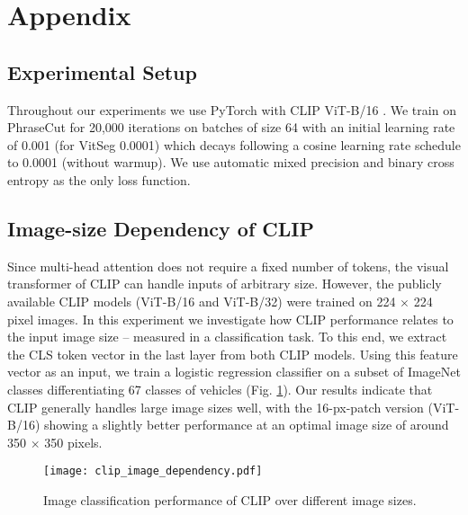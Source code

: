 \documentclass[10pt,twocolumn,letterpaper]{article}
\begin{document}
{
\small


}

\clearpage

\section*{Appendix}

\subsection*{Experimental Setup}

\label{sec:train_setup}

Throughout our experiments we use PyTorch \cite{pytorch} with CLIP ViT-B/16 \cite{radford20}. We train on PhraseCut \cite{wu20phrasecut} for 20,000 iterations on batches of size 64 with an initial learning rate of 0.001 (for VitSeg 0.0001) which decays following a cosine learning rate schedule to 0.0001 (without warmup). We use automatic mixed precision and binary cross entropy as the only loss function.


\subsection*{Image-size Dependency of CLIP}
Since multi-head attention does not require a fixed number of tokens, the visual transformer of CLIP can handle inputs of arbitrary size. However, the publicly available CLIP models (ViT-B/16 and ViT-B/32) were trained on 224 $\times$ 224 pixel images. In this experiment we investigate how CLIP performance relates to the input image size -- measured in a classification task.
To this end, we extract the CLS token vector in the last layer from both CLIP models. Using this feature vector as an input, we train a logistic regression classifier on a subset of ImageNet \cite{imagenet} classes differentiating 67 classes of vehicles (Fig. \ref{fig:image_size}).
Our results indicate that CLIP generally handles large image sizes well, with the 16-px-patch version (ViT-B/16) showing a slightly better performance at an optimal image size of around 350 $\times$ 350 pixels.

\begin{figure}[h]
    \centering
    \texttt{[image: clip\_image\_dependency.pdf]}
    \caption{Image classification performance of CLIP over different image sizes.}
    \label{fig:image_size}
\end{figure}
\end{document}
